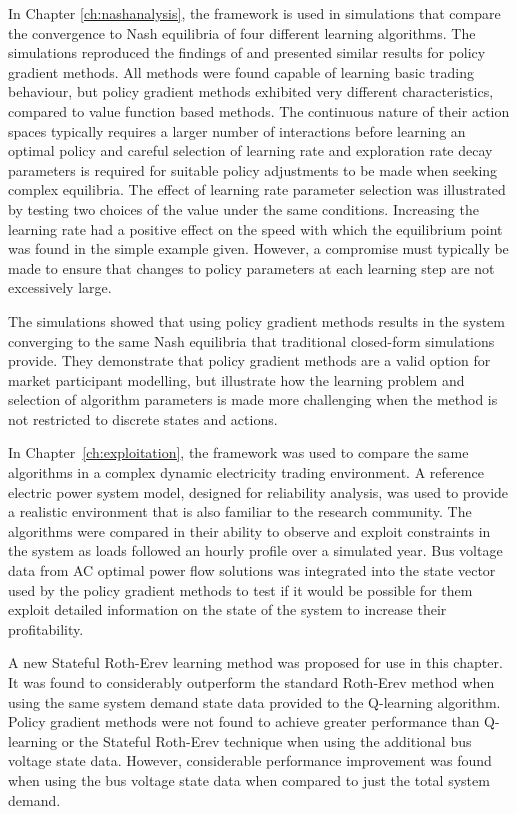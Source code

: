 In Chapter \ref{ch:nashanalysis}, the framework is used in simulations that
compare the convergence to Nash equilibria of four different learning
algorithms.  The simulations reproduced the findings of 
and presented similar results for policy gradient methods.  All methods were
found capable of learning basic trading behaviour, but policy gradient methods
exhibited very different characteristics, compared to value function based
methods. The continuous nature of their action spaces typically requires a
larger number of interactions before learning an optimal policy and careful
selection of learning rate and exploration rate decay parameters is required for
suitable policy adjustments to be made when seeking complex equilibria.
The effect of learning rate parameter selection was illustrated by testing
two choices of the value under the same conditions. Increasing the learning rate
had a positive effect on the speed with which the equilibrium point was found in
the simple example given.  However, a compromise must typically be made to
ensure that changes to policy parameters at each learning step are not
excessively large.

The simulations showed that using policy gradient methods results in the system
converging to the same Nash equilibria that traditional closed-form simulations
provide.  They demonstrate that policy gradient methods are a valid option for
market participant modelling, but illustrate how the learning problem and
selection of algorithm parameters is made more challenging when the method is
not restricted to discrete states and actions.

In Chapter~\ref{ch:exploitation}, the framework was used to compare the same
algorithms in a complex dynamic electricity trading environment.  A reference
electric power system model, designed for reliability analysis, was used to
provide a realistic environment that is also familiar to the research community.
The algorithms were compared in their ability to observe and exploit constraints in
the system as loads followed an hourly profile over a simulated year.  Bus
voltage data from AC optimal power flow solutions was integrated into the state
vector used by the policy gradient methods to test if it would be possible for
them exploit detailed information on the state of the system to increase their
profitability.

A new Stateful Roth-Erev learning method was proposed for use in this chapter.
It was found to considerably outperform the standard Roth-Erev method when using
the same system demand state data provided to the Q-learning algorithm. Policy
gradient methods were not found to achieve greater performance than Q-learning
or the Stateful Roth-Erev technique when using the additional bus voltage state
data.  However, considerable performance improvement was found when using the
bus voltage state data when compared to just the total system demand.

